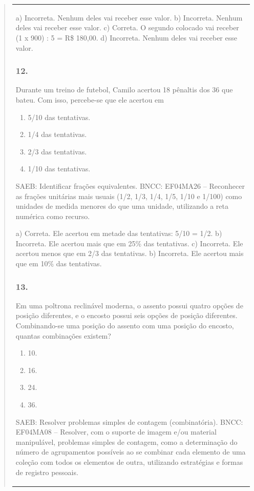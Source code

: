 \begin{mdframed}[linewidth=2pt,linecolor=salmao,roundcorner=2pt]
\begin{itemize}
{\begin{itemize}
\begin{escolha}
{\begin{quote}
{\begin{escolha}
{{{{{\begin{longtable}[]{@{}l@{}}
\begin{itemize}
{a) Incorreta. Nenhum deles vai receber esse valor.
b) Incorreta. Nenhum deles vai receber esse valor.
c) Correta. O segundo colocado vai receber (1 x 900) : 5 = R\$ 180,00.
d) Incorreta. Nenhum deles vai receber esse valor.

\subsubsection{12.}

Durante um treino de futebol, Camilo acertou 18 pênaltis dos 36 que
bateu. Com isso, percebe-se que ele acertou em

\begin{enumerate}
\item
  5/10 das tentativas.
\item
  1/4 das tentativas.
\item
  2/3 das tentativas.
\item
  1/10 das tentativas.
\end{enumerate}

SAEB: Identificar frações equivalentes.
BNCC: EF04MA26 -- Reconhecer as frações unitárias mais usuais (1/2, 1/3, 1/4, 1/5, 1/10 e 1/100) como
unidades de medida menores do que uma unidade, utilizando a reta numérica como recurso.

a) Correta. Ele acertou em metade das tentativas: 5/10 = 1/2.
b) Incorreta. Ele acertou mais que em 25\% das tentativas.
c) Incorreta. Ele acertou menos que em 2/3 das tentativas.
b) Incorreta. Ele acertou mais que em 10\% das tentativas.

\subsubsection{13.}

Em uma poltrona reclinável moderna, o assento possui quatro opções de posição
diferentes, e o encosto possui seis opções de posição diferentes. Combinando-se uma posição do assento com uma posição do encosto, quantas combinações existem?

\begin{enumerate}
\item
  10.
\item
  16.
\item
  24.
\item
  36.
\end{enumerate}

SAEB: Resolver problemas simples de contagem (combinatória).
BNCC: EF04MA08 -- Resolver, com o suporte de imagem e/ou material manipulável, problemas simples
de contagem, como a determinação do número de agrupamentos possíveis ao se combinar cada
elemento de uma coleção com todos os elementos de outra, utilizando estratégias e formas de
registro pessoais.

}
\end{itemize}
\end{longtable}}}}}}
\end{escolha}}
\end{quote}}
\end{escolha}
\end{itemize}}
\end{itemize}
\end{mdframed}
